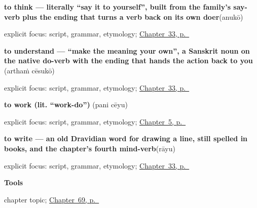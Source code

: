 \noindent\begin{minipage}[t]{\linewidth}
\raggedright
\textbf{to think — literally \textquotedblleft{}say it to yourself\textquotedblright{}, built from the family's say-verb plus the ending that turns a verb back on its own doer}\enspace\emph{}\enspace(anukō)\par
\footnotesize explicit focus: script, grammar, etymology; \hyperref[ch:te-verbs-of-the-mind]{Chapter~33, p.~\pageref*{ch:te-verbs-of-the-mind}}
\end{minipage}\par\smallskip

\noindent\begin{minipage}[t]{\linewidth}
\raggedright
\textbf{to understand — \textquotedblleft{}make the meaning your own\textquotedblright{}, a Sanskrit noun on the native do-verb with the ending that hands the action back to you}\enspace\emph{ }\enspace(arthaṁ cēsukō)\par
\footnotesize explicit focus: script, grammar, etymology; \hyperref[ch:te-verbs-of-the-mind]{Chapter~33, p.~\pageref*{ch:te-verbs-of-the-mind}}
\end{minipage}\par\smallskip

\noindent\begin{minipage}[t]{\linewidth}
\raggedright
\textbf{to work (lit. \textquotedblleft{}work-do\textquotedblright{})}\enspace\emph{ }\enspace(pani cēyu)\par
\footnotesize explicit focus: script, grammar, etymology; \hyperref[ch:first-verbs]{Chapter~5, p.~\pageref*{ch:first-verbs}}
\end{minipage}\par\smallskip

\noindent\begin{minipage}[t]{\linewidth}
\raggedright
\textbf{to write — an old Dravidian word for drawing a line, still spelled  in books, and the chapter's fourth mind-verb}\enspace\emph{}\enspace(rāyu)\par
\footnotesize explicit focus: script, grammar, etymology; \hyperref[ch:te-verbs-of-the-mind]{Chapter~33, p.~\pageref*{ch:te-verbs-of-the-mind}}
\end{minipage}\par\smallskip

\noindent\begin{minipage}[t]{\linewidth}
\raggedright
\textbf{Tools}\par
\footnotesize chapter topic; \hyperref[ch:te-tools]{Chapter~69, p.~\pageref*{ch:te-tools}}
\end{minipage}\par\smallskip

